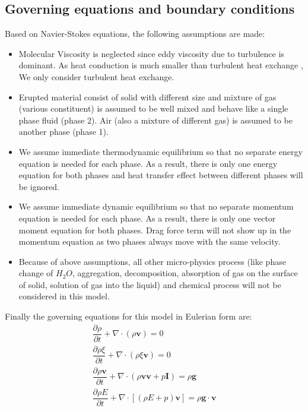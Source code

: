 \documentclass[10pt,a4paper]{article}
\begin{document}
\subsection{Governing equations\citep{suzuki2005numerical} and boundary conditions}
Based on Navier-Stokes equations, the following assumptions are made:
\begin{itemize}
\item Molecular Viscosity is neglected since eddy viscosity due to turbulence is dominant. As heat conduction is much smaller than turbulent heat exchange \citep{oberhuber1998volcanic}, We only consider turbulent heat exchange.
\item Erupted material consist of solid with different size and mixture of gas (various constituent) is assumed to be well mixed and behave like a single phase fluid (phase 2). Air (also a mixture of different gas) is assumed to be another phase (phase 1).
\item We assume immediate thermodynamic equilibrium so that no separate energy equation is needed for each phase. As a result, there is only one energy equation for both phases and heat transfer effect between different phases will be ignored.
\item We assume immediate dynamic equilibrium so that no separate momentum equation is needed for each phase. As a result, there is only one vector moment equation for both phases. Drag force term will not show up in the momentum equation as two phases always move with the same velocity.
\item Because of above assumptions, all other micro-physics process (like phase change of $H_2O$, aggregation, decomposition, absorption of gas on the surface of solid, solution of gas into the liquid) and chemical process will not be considered in this model.
\end{itemize}
Finally the governing equations for this model in Eulerian form are:
\begin{align}
\dfrac{\partial \rho}{\partial t} + \nabla \cdot (\rho \textbf{v}) = 0 \label{eq:gov-cs-rho}\\
\dfrac{\partial \rho \xi}{\partial t} + \nabla \cdot (\rho \xi \textbf{v}) = 0 \label{eq:gov-cs-ks} \\
\dfrac{\partial \rho \textbf{v}}{\partial t} + \nabla \cdot (\rho \textbf{v} \textbf{v} + p\textbf{I}) = \rho \textbf{g} \label{eq:gov-cs-v} \\
\dfrac{\partial \rho E}{\partial t} + \nabla \cdot [(\rho E + p )\textbf{v}] = \rho \textbf{g} \cdot\textbf{v} \label{eq:gov-cs-e}
\end{align}
\end{document}
